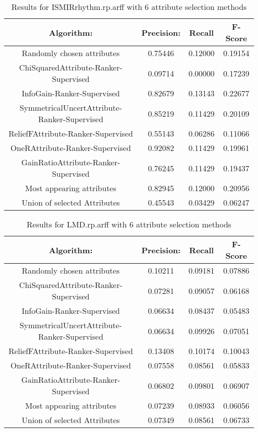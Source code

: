 \begin{table}[p]
\begin{center}
\begin{tabular}{|c|c|c|c|}
\hline Algorithm: & Precision: & Recall & F-Score\\
\hline Randomly chosen attributes & 0.75446 & 0.12000 & 0.19154\\
\hline ChiSquaredAttribute-Ranker-Supervised & 0.09714 & 0.00000 & 0.17239\\
\hline InfoGain-Ranker-Supervised & 0.82679 & 0.13143 & 0.22677\\
\hline SymmetricalUncertAttribute-Ranker-Supervised & 0.85219 & 0.11429 &
0.20109\\
\hline ReliefFAttribute-Ranker-Supervised & 0.55143 & 0.06286 & 0.11066\\
\hline OneRAttribute-Ranker-Supervised & 0.92082 & 0.11429 & 0.19961\\
\hline GainRatioAttribute-Ranker-Supervised & 0.76245 & 0.11429 & 0.19437\\
\hline Most appearing attributes & 0.82945 & 0.12000 & 0.20956\\
\hline Union of selected Attributes & 0.45543 & 0.03429 & 0.06247\\

\hline
\end{tabular}
\caption{Results for ISMIRrhythm.rp.arff with 6 attribute selection methods}
\label{table:classifier:ISMIRrhythm6}
\end{center}
\end{table}


\begin{table}[p]
\begin{center}
\begin{tabular}{|c|c|c|c|}
\hline Algorithm: & Precision: & Recall & F-Score\\
\hline Randomly chosen attributes & 0.10211 & 0.09181 & 0.07886\\
\hline ChiSquaredAttribute-Ranker-Supervised & 0.07281 & 0.09057 & 0.06168\\
\hline InfoGain-Ranker-Supervised & 0.06634 & 0.08437 & 0.05483\\
\hline SymmetricalUncertAttribute-Ranker-Supervised & 0.06634 & 0.09926 &
0.07051\\
\hline ReliefFAttribute-Ranker-Supervised & 0.13408 & 0.10174 & 0.10043\\
\hline OneRAttribute-Ranker-Supervised & 0.07558 & 0.08561 & 0.05833\\
\hline GainRatioAttribute-Ranker-Supervised & 0.06802 & 0.09801 & 0.06907\\
\hline Most appearing attributes & 0.07239 & 0.08933 & 0.06056\\
\hline Union of selected Attributes & 0.07349 & 0.08561 & 0.06733\\

\hline
\end{tabular}
\caption{Results for LMD.rp.arff with 6 attribute selection methods}
\label{table:classifier:LMD6}
\end{center}
\end{table}





